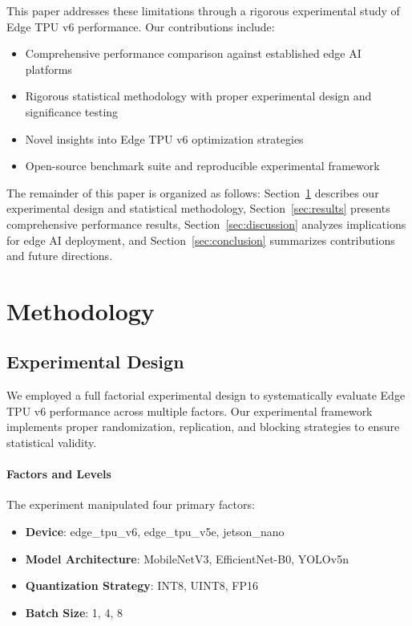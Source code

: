 \documentclass[conference]{IEEEtran}
\begin{document}
This paper addresses these limitations through a rigorous experimental study of Edge TPU v6 performance. Our contributions include:

\begin{itemize}
\item Comprehensive performance comparison against established edge AI platforms
\item Rigorous statistical methodology with proper experimental design and significance testing
\item Novel insights into Edge TPU v6 optimization strategies
\item Open-source benchmark suite and reproducible experimental framework
\end{itemize}

The remainder of this paper is organized as follows: Section~\ref{sec:methodology} describes our experimental design and statistical methodology, Section~\ref{sec:results} presents comprehensive performance results, Section~\ref{sec:discussion} analyzes implications for edge AI deployment, and Section~\ref{sec:conclusion} summarizes contributions and future directions.
\section{Methodology}
\label{sec:methodology}

\subsection{Experimental Design}

We employed a full factorial experimental design to systematically evaluate Edge TPU v6 performance across multiple factors. Our experimental framework implements proper randomization, replication, and blocking strategies to ensure statistical validity.

\paragraph{Factors and Levels} The experiment manipulated four primary factors:
\begin{itemize}
\item \textbf{Device}: edge_tpu_v6, edge_tpu_v5e, jetson_nano
\item \textbf{Model Architecture}: MobileNetV3, EfficientNet-B0, YOLOv5n
\item \textbf{Quantization Strategy}: INT8, UINT8, FP16
\item \textbf{Batch Size}: 1, 4, 8
\end{itemize}
\end{document}
